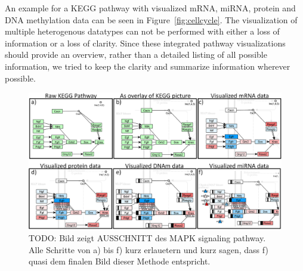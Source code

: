 \documentclass{bioinfo}
\begin{document}
An example for a KEGG pathway with visualized mRNA, miRNA, protein and DNA methylation data can be
seen in Figure~\ref{fig:cellcycle}. The visualization of multiple heterogenous datatypes can not be
performed with either a loss of information or a loss of clarity. Since these integrated pathway
visualizations should provide an overview, rather than a detailed listing of all possible
information, we tried to keep the clarity and summarize information wherever possible.




\begin{figure}[t] \centering \includegraphics[width=1.0\textwidth]{figures/visualization-steps.png}
\caption{ TODO: Bild zeigt AUSSCHNITT des MAPK signaling pathway. Alle Schritte von a) bis f) kurz
          erlauetern und kurz sagen, dass f) quasi dem finalen Bild dieser Methode entspricht. }
\label{fig:visualization_steps} 
\end{figure}


\end{document}

